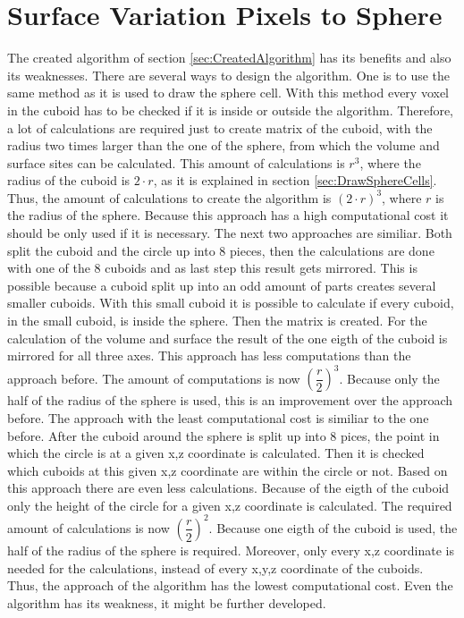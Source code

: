 \section{Surface Variation Pixels to Sphere}
The created algorithm of section \ref{sec:CreatedAlgorithm} has its benefits and also its weaknesses. There are several ways to design the algorithm. One is to use the same method as it is used to draw the sphere cell. With this method every voxel in the cuboid has to be checked if it is inside or outside the algorithm. Therefore, a lot of calculations are required just to create matrix of the cuboid, with the radius two times larger than the one of the sphere, from which the volume and surface sites can be calculated. This amount of calculations is $r^{3}$, where the radius of the cuboid is $2 \cdot r$, as it is explained in section \ref{sec:DrawSphereCells}. Thus, the amount of calculations to create the algorithm is $(2 \cdot r)^{3}$, where $r$ is the radius of the sphere. Because this approach has a high computational cost it should be only used if it is necessary. \newline
The next two approaches are similiar. Both split the cuboid and the circle up into 8 pieces, then the calculations are done with one of the 8 cuboids and as last step this result gets mirrored. This is possible because a cuboid split up into an odd amount of parts creates several smaller cuboids. With this small cuboid it is possible to calculate if every cuboid, in the small cuboid, is inside the sphere. Then the matrix is created. For the calculation of the volume and surface the result of the one eigth of the cuboid is mirrored for all three axes. This approach has less computations than the approach before. The amount of computations is now $(\dfrac{r}{2})^{3}$. Because only the half of the radius of the sphere is used, this is an improvement over the approach before. \newline
The approach with the least computational cost is similiar to the one before. After the cuboid around the sphere is split up into 8 pices, the point in which the circle is at a given x,z coordinate is calculated. Then it is checked which cuboids at this given x,z coordinate are within the circle or not. Based on this approach there are even less calculations. Because of the eigth of the cuboid only the height of the circle for a given x,z coordinate is calculated. The required amount of calculations is now $(\dfrac{r}{2})^{2}$. Because one eigth of the cuboid is used, the half of the radius of the sphere is required. Moreover, only every x,z coordinate is needed for the calculations, instead of every x,y,z coordinate of the cuboids. Thus, the approach of the algorithm has the lowest computational cost. Even the algorithm has its weakness, it might be further developed.

